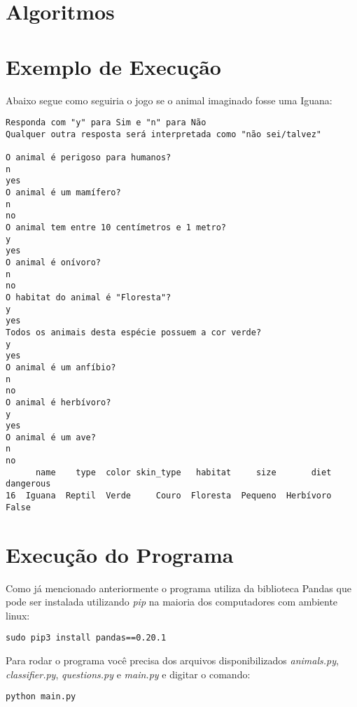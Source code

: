 \documentclass{article}
\begin{document}
\pagebreak
{}

\pagebreak


\section{Algoritmos}





\section{Exemplo de Execução}

Abaixo segue como seguiria o jogo se o animal imaginado fosse uma Iguana:

\begin{verbatim}
Responda com "y" para Sim e "n" para Não
Qualquer outra resposta será interpretada como "não sei/talvez"

O animal é perigoso para humanos?
n
yes
O animal é um mamífero?
n
no
O animal tem entre 10 centímetros e 1 metro?
y
yes
O animal é onívoro?
n
no
O habitat do animal é "Floresta"?
y
yes
Todos os animais desta espécie possuem a cor verde?
y
yes
O animal é um anfíbio?
n
no
O animal é herbívoro?
y
yes
O animal é um ave?
n
no
      name    type  color skin_type   habitat     size       diet dangerous
16  Iguana  Reptil  Verde     Couro  Floresta  Pequeno  Herbívoro     False
\end{verbatim}


\section{Execução do Programa}

Como já mencionado anteriormente o programa utiliza da biblioteca Pandas que pode ser instalada utilizando \textit{pip} na maioria dos computadores com ambiente linux:

\begin{verbatim}
sudo pip3 install pandas==0.20.1
\end{verbatim}

Para rodar o programa você precisa dos arquivos disponibilizados \textit{animals.py}, \textit{classifier.py}, \textit{questions.py} e \textit{main.py} e digitar o comando:

\begin{verbatim}
python main.py
\end{verbatim}
\end{document}
